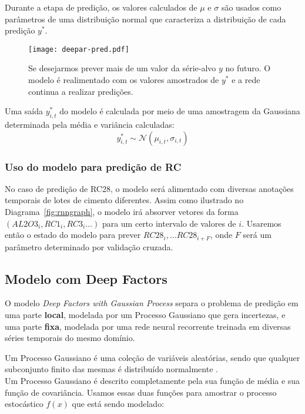 Durante a etapa de predição, os valores calculados de $\mu$ e $\sigma$ são
usados como parâmetros de uma distribuição normal que caracteriza a distribuição
de cada predição $y^*$.


\begin{figure}[H]
  \centering
  \texttt{[image: deepar-pred.pdf]}
  \caption{Se desejarmos prever mais de um valor da série-alvo $y$ no futuro. O
    modelo é realimentado com os valores amostrados de $y^*$ e a rede continua a
  realizar predições.}
  \label{fig:deepartrain}
\end{figure}


Uma saída $y^*_{i,t}$ do modelo é calculada por meio de uma amostragem da Gaussiana determinada pela média e variância calculadas: \\

\[
 y^*_{i,t} \sim \mathcal{N}(\mu_{i,t},\sigma_{i,t}) 
\]

\subsubsection{Uso do modelo para predição de RC}

No caso de predição de RC28, o modelo será alimentado com diversas anotações
temporais de lotes de cimento diferentes. Assim como ilustrado no
Diagrama~\ref{fig:rnngraph}, o modelo irá absorver vetores da forma
$(AL2O3_i,RC1_i,RC3_i \dots)$ para um certo intervalo de valores de $i$.
Usaremos então o estado do modelo para prever $RC28_i, \dots RC28_{i+F}$, onde
$F$ será um parâmetro determinado por validação cruzada.

\subsection{Modelo com Deep Factors}

O modelo \textit{Deep Factors with Gaussian Process} \citep{deepfactors} separa o problema de predição em uma parte \textbf{local}, modelada por um Processo Gaussiano que gera incertezas, e uma parte \textbf{fixa}, modelada por uma rede neural recorrente treinada em diversas séries temporais do mesmo domínio.


Um Processo Gaussiano é uma coleção de variáveis aleatórias,
sendo que qualquer subconjunto finito das mesmas é distribuído normalmente \citep{gpml}. \\

Um Processo Gaussiano é descrito completamente pela sua função de média e sua função de covariância. Usamos essas duas funções para amostrar o processo estocástico $f(x)$ que está sendo modelado: \\

